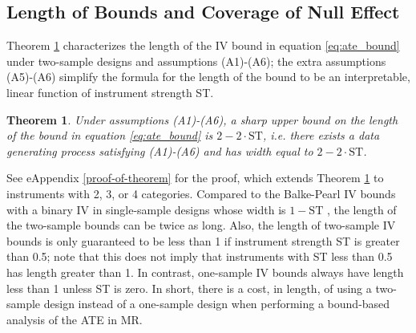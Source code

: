 \documentclass[
]{article}
\theoremstyle{plain}
\newtheorem{theorem}{Theorem}[section]
\begin{document}
\hypertarget{length-of-bounds-and-coverage-of-null-effect}{%
\subsection{Length of Bounds and Coverage of Null Effect}\label{length-of-bounds-and-coverage-of-null-effect}}

\label{bounds-from-bivariate-data}
\label{properties-of-bounds-from-summary-level-data}

Theorem \ref{thm:upperBoundWidth} characterizes the length of the IV bound in equation \eqref{eq:ate_bound} under two-sample designs and assumptions (A1)-(A6); the extra assumptions (A5)-(A6) simplify the formula for the length of the bound to be an interpretable, linear function of instrument strength ST.

\begin{theorem}\label{thm:upperBoundWidth}
Under assumptions (A1)-(A6), a sharp upper bound on the length of the bound in equation \eqref{eq:ate_bound} is $2 - 2\cdot \text{ST}$, i.e. there exists a data generating process satisfying (A1)-(A6) and has width equal to $2 - 2\cdot \text{ST}$.
\end{theorem}

See eAppendix \ref{proof-of-theorem} for the proof, which extends Theorem \ref{thm:upperBoundWidth} to instruments with 2, 3, or 4 categories. Compared to the Balke-Pearl IV bounds with a binary IV in single-sample designs whose width is \(1-\text{ST}\) \autocite{balke_bounds_1997}, the length of the two-sample bounds can be twice as long. Also, the length of two-sample IV bounds is only guaranteed to be less than 1 if instrument strength ST is greater than 0.5; note that this does not imply that instruments with ST less than 0.5 has length greater than 1. In contrast, one-sample IV bounds always have length less than 1 unless ST is zero. In short, there is a cost, in length, of using a two-sample design instead of a one-sample design when performing a bound-based analysis of the ATE in MR.
\end{document}
